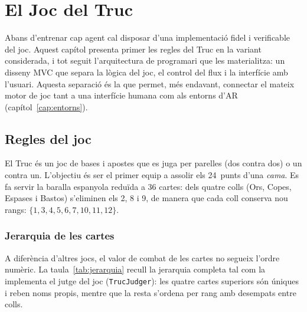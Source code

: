 
\chapter{El Joc del Truc}
\label{cap:joc}

Abans d'entrenar cap agent cal disposar d'una implementació fidel i verificable
del joc. Aquest capítol presenta primer les regles del Truc en la variant
considerada, i tot seguit l'arquitectura de programari que les materialitza: un
disseny \acf{MVC} que separa la lògica del joc, el control del flux i la interfície
amb l'usuari. Aquesta separació és la que permet, més endavant, connectar el mateix
motor de joc tant a una interfície humana com als entorns d'\ac{AR}
(capítol~\ref{cap:entorns}).

\section{Regles del joc}
\label{sec:regles}

El Truc és un joc de bases i apostes que es juga per parelles (dos contra dos) o
un contra un. L'objectiu és ser el primer equip a assolir els 24~punts d'una
\emph{cama}. Es fa servir la baralla espanyola reduïda a 36 cartes: dels quatre
colls (Ors, Copes, Espases i Bastos) s'eliminen els 2, 8 i 9, de manera que
cada coll conserva nou rangs: $\{1, 3, 4, 5, 6, 7, 10, 11, 12\}$.

\subsection*{Jerarquia de les cartes}

A diferència d'altres jocs, el valor de combat de les cartes no segueix l'ordre
numèric. La taula~\ref{tab:jerarquia} recull la jerarquia completa tal com la
implementa el jutge del joc (\texttt{TrucJudger}): les quatre cartes superiors són
úniques i reben noms propis, mentre que la resta s'ordena per rang amb desempats
entre colls.


